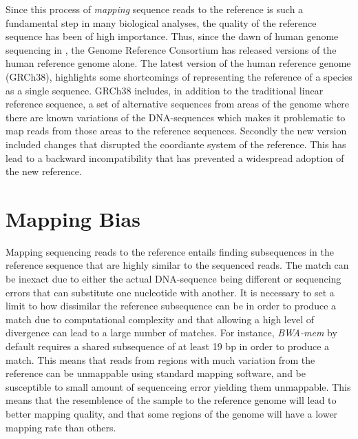 Since this process of \emph{mapping} sequence reads to the reference is such a fundamental step in many biological analyses, the quality of the reference sequence has been of high importance. Thus, since the dawn of human genome sequencing in , the Genome Reference Consortium has released  versions of the human reference genome alone. The latest version of the human reference genome (GRCh38), highlights some shortcomings of representing the reference of a species as a single sequence. GRCh38 includes, in addition to the traditional linear reference sequence, a set of alternative sequences from areas of the genome where there are known variations of the DNA-sequences which makes it problematic to map reads from those areas to the reference sequences. Secondly the new version included changes that disrupted the coordiante system of the reference. This has lead to a backward incompatibility that has prevented a widespread adoption of the new reference.

\section{Mapping Bias}
Mapping sequencing reads to the reference entails finding subsequences in the reference sequence that are highly similar to the sequenced reads. The match can be inexact due to either the actual DNA-sequence being different or sequencing errors that can substitute one nucleotide with another. It is necessary to set a limit to how dissimilar the reference subsequence can be in order to produce a match due to computational complexity and that allowing a high level of divergence can lead to a large number of matches. For instance, \emph{BWA-mem} by default requires a shared subsequence of at least 19 bp in order to produce a match. This means that reads from regions with much variation from the reference can be unmappable using standard mapping software, and be susceptible to small amount of sequenceing error yielding them unmappable. This means that the resemblence of the sample to the reference genome will lead to better mapping quality, and that some regions of the genome will have a lower mapping rate than others. 


